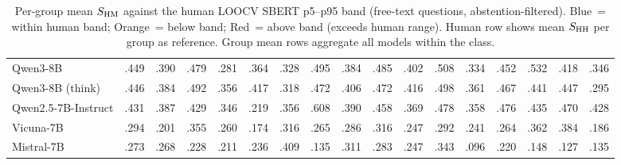 \begin{table}[t]
\begin{tabular}{lcccccccccccccccc}
\quad Qwen3-8B & \cellcolor[HTML]{D9EAF3}.449 & \cellcolor[HTML]{D9EAF3}.390 & \cellcolor[HTML]{D9EAF3}.479 & \cellcolor[HTML]{F7EBD9}.281 & \cellcolor[HTML]{D9EAF3}.364 & \cellcolor[HTML]{D9EAF3}.328 & \cellcolor[HTML]{D9EAF3}.495 & \cellcolor[HTML]{D9EAF3}.384 & \cellcolor[HTML]{D9EAF3}.485 & \cellcolor[HTML]{D9EAF3}.402 & \cellcolor[HTML]{D9EAF3}.508 & \cellcolor[HTML]{D9EAF3}.334 & \cellcolor[HTML]{D9EAF3}.452 & \cellcolor[HTML]{D9EAF3}.532 & \cellcolor[HTML]{D9EAF3}.418 & \cellcolor[HTML]{F7EBD9}.346 \\
\quad Qwen3-8B (think) & \cellcolor[HTML]{D9EAF3}.446 & \cellcolor[HTML]{D9EAF3}.384 & \cellcolor[HTML]{D9EAF3}.492 & \cellcolor[HTML]{D9EAF3}.356 & \cellcolor[HTML]{D9EAF3}.417 & \cellcolor[HTML]{D9EAF3}.318 & \cellcolor[HTML]{D9EAF3}.472 & \cellcolor[HTML]{D9EAF3}.406 & \cellcolor[HTML]{D9EAF3}.472 & \cellcolor[HTML]{D9EAF3}.416 & \cellcolor[HTML]{D9EAF3}.498 & \cellcolor[HTML]{D9EAF3}.361 & \cellcolor[HTML]{D9EAF3}.467 & \cellcolor[HTML]{D9EAF3}.441 & \cellcolor[HTML]{D9EAF3}.447 & \cellcolor[HTML]{F7EBD9}.295 \\
\quad Qwen2.5-7B-Instruct & \cellcolor[HTML]{D9EAF3}.431 & \cellcolor[HTML]{D9EAF3}.387 & \cellcolor[HTML]{D9EAF3}.429 & \cellcolor[HTML]{D9EAF3}.346 & \cellcolor[HTML]{D9EAF3}.219 & \cellcolor[HTML]{D9EAF3}.356 & \cellcolor[HTML]{D9EAF3}.608 & \cellcolor[HTML]{D9EAF3}.390 & \cellcolor[HTML]{D9EAF3}.458 & \cellcolor[HTML]{D9EAF3}.369 & \cellcolor[HTML]{D9EAF3}.478 & \cellcolor[HTML]{D9EAF3}.358 & \cellcolor[HTML]{D9EAF3}.476 & \cellcolor[HTML]{D9EAF3}.435 & \cellcolor[HTML]{D9EAF3}.470 & \cellcolor[HTML]{D9EAF3}.428 \\
\quad Vicuna-7B & \cellcolor[HTML]{F7EBD9}.294 & \cellcolor[HTML]{F7EBD9}.201 & \cellcolor[HTML]{F7EBD9}.355 & \cellcolor[HTML]{F7EBD9}.260 & \cellcolor[HTML]{F7EBD9}.174 & \cellcolor[HTML]{D9EAF3}.316 & \cellcolor[HTML]{F7EBD9}.265 & \cellcolor[HTML]{F7EBD9}.286 & \cellcolor[HTML]{F7EBD9}.316 & \cellcolor[HTML]{F7EBD9}.247 & \cellcolor[HTML]{F7EBD9}.292 & \cellcolor[HTML]{F7EBD9}.241 & \cellcolor[HTML]{F7EBD9}.264 & \cellcolor[HTML]{F7EBD9}.362 & \cellcolor[HTML]{D9EAF3}.384 & \cellcolor[HTML]{F7EBD9}.186 \\
\quad Mistral-7B & \cellcolor[HTML]{F7EBD9}.273 & \cellcolor[HTML]{F7EBD9}.268 & \cellcolor[HTML]{F7EBD9}.228 & \cellcolor[HTML]{F7EBD9}.211 & \cellcolor[HTML]{D9EAF3}.236 & \cellcolor[HTML]{D9EAF3}.409 & \cellcolor[HTML]{F7EBD9}.135 & \cellcolor[HTML]{F7EBD9}.311 & \cellcolor[HTML]{F7EBD9}.283 & \cellcolor[HTML]{F7EBD9}.247 & \cellcolor[HTML]{F7EBD9}.343 & \cellcolor[HTML]{F7EBD9}.096 & \cellcolor[HTML]{F7EBD9}.220 & \cellcolor[HTML]{F7EBD9}.148 & \cellcolor[HTML]{F7EBD9}.127 & \cellcolor[HTML]{F7EBD9}.135 \\
\bottomrule
\end{tabular}
\caption{Per-group mean $\sHM$ against the human LOOCV SBERT p5--p95 band (free-text questions, abstention-filtered). \colorbox[HTML]{D9EAF3}{Blue}~= within human band; \colorbox[HTML]{F7EBD9}{Orange}~= below band; \colorbox[HTML]{FFCCCC}{Red}~= above band (exceeds human range). Human row shows mean $\sHH$ per group as reference. Group mean rows aggregate all models within the class.}
\label{tab:group_band_coverage}
\end{table}
